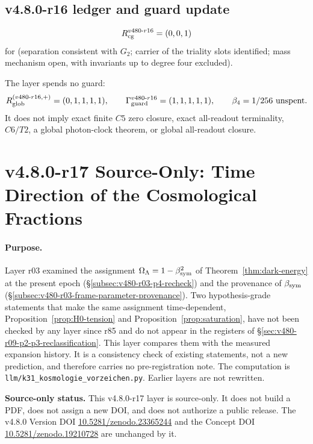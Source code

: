 \subsection*{v4.8.0-r16 ledger and guard update}
\label{subsec:v480-r16-ledger-guard}

\[
R_{\rm cg}^{v480\text{-}r16}=(0,0,1)
\]
for (separation consistent with \(G_2\); carrier of the triality slots identified; mass mechanism open, with
invariants up to degree four excluded).

The layer spends no guard:
\[
R_{\rm glob}^{(v480\text{-}r16,+)}=(0,1,1,1,1),
\qquad
\Gamma_{\rm guard}^{v480\text{-}r16}=(1,1,1,1,1),
\qquad
\beta_4=1/256\ \text{unspent}.
\]
It does not imply exact finite \(C5\) zero closure, exact all-readout terminality,
\(C6/T2\), a global photon-clock theorem, or global all-readout closure.

\clearpage
\section*{v4.8.0-r17 Source-Only: Time Direction of the Cosmological Fractions}
\label{sec:v480-r17-cosmological-time-direction}

\paragraph{Purpose.}
Layer r03 examined the assignment \(\Omega_\Lambda=1-\beta_{\mathrm{sym}}^2\) of Theorem~\ref{thm:dark-energy} at the present
epoch (\S\ref{subsec:v480-r03-p4-recheck}) and the provenance of \(\beta_{\mathrm{sym}}\)
(\S\ref{subsec:v480-r03-frame-parameter-provenance}).  Two hypothesis-grade statements that make the same
assignment time-dependent, Proposition~\ref{prop:H0-tension} and Proposition~\ref{prop:saturation}, have not been
checked by any layer since r85 and do not appear in the registers of \S\ref{sec:v480-r09-p2-p3-reclassification}.
This layer compares them with the measured expansion history.  It is a consistency check of existing statements,
not a new prediction, and therefore carries no pre-registration note.  The computation is
\texttt{llm/k31\_kosmologie\_vorzeichen.py}.  Earlier layers are not rewritten.

\noindent\textbf{Source-only status.}
This v4.8.0-r17 layer is source-only.  It does not build a PDF, does not assign a new DOI,
and does not authorize a public release.  The v4.8.0 Version DOI
\href{https://doi.org/10.5281/zenodo.23365244}{10.5281/zenodo.23365244} and the Concept DOI
\href{https://doi.org/10.5281/zenodo.19210728}{10.5281/zenodo.19210728} are unchanged by it.

